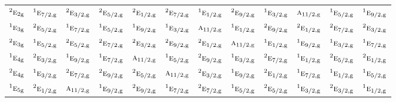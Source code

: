 \documentclass[10pt,a4paper]{article}
\numberwithin{equation}{section}
\newcommand{\irr}[1]{\text{\normalfont\scshape #1}}
\newcommand{\conjpair}[1]{{}^{#1}}
\newcommand{\ptag}[1]{\mathrm{#1}}
\begin{document}
{\begin{longtable}{@{}lccccccccccc@{}}
$\conjpair{2}\irr{e}_{2\ptag{g}}$ & $\conjpair{1}\irr{e}_{7/2,\ptag{g}}$ & $\conjpair{2}\irr{e}_{3/2,\ptag{g}}$ & $\conjpair{2}\irr{e}_{5/2,\ptag{g}}$ & $\conjpair{2}\irr{e}_{1/2,\ptag{g}}$ & $\conjpair{2}\irr{e}_{7/2,\ptag{g}}$ & $\conjpair{1}\irr{e}_{1/2,\ptag{g}}$ & $\conjpair{2}\irr{e}_{9/2,\ptag{g}}$ & $\conjpair{1}\irr{e}_{3/2,\ptag{g}}$ & $\irr{a}_{11/2,\ptag{g}}$ & $\conjpair{1}\irr{e}_{5/2,\ptag{g}}$ & $\conjpair{1}\irr{e}_{9/2,\ptag{g}}$\\
$\conjpair{1}\irr{e}_{3\ptag{g}}$ & $\conjpair{2}\irr{e}_{5/2,\ptag{g}}$ & $\conjpair{1}\irr{e}_{7/2,\ptag{g}}$ & $\conjpair{1}\irr{e}_{5/2,\ptag{g}}$ & $\conjpair{1}\irr{e}_{9/2,\ptag{g}}$ & $\conjpair{1}\irr{e}_{3/2,\ptag{g}}$ & $\irr{a}_{11/2,\ptag{g}}$ & $\conjpair{1}\irr{e}_{1/2,\ptag{g}}$ & $\conjpair{2}\irr{e}_{9/2,\ptag{g}}$ & $\conjpair{2}\irr{e}_{1/2,\ptag{g}}$ & $\conjpair{2}\irr{e}_{7/2,\ptag{g}}$ & $\conjpair{2}\irr{e}_{3/2,\ptag{g}}$\\
$\conjpair{2}\irr{e}_{3\ptag{g}}$ & $\conjpair{1}\irr{e}_{5/2,\ptag{g}}$ & $\conjpair{2}\irr{e}_{5/2,\ptag{g}}$ & $\conjpair{2}\irr{e}_{7/2,\ptag{g}}$ & $\conjpair{2}\irr{e}_{3/2,\ptag{g}}$ & $\conjpair{2}\irr{e}_{9/2,\ptag{g}}$ & $\conjpair{2}\irr{e}_{1/2,\ptag{g}}$ & $\irr{a}_{11/2,\ptag{g}}$ & $\conjpair{1}\irr{e}_{1/2,\ptag{g}}$ & $\conjpair{1}\irr{e}_{9/2,\ptag{g}}$ & $\conjpair{1}\irr{e}_{3/2,\ptag{g}}$ & $\conjpair{1}\irr{e}_{7/2,\ptag{g}}$\\
$\conjpair{1}\irr{e}_{4\ptag{g}}$ & $\conjpair{2}\irr{e}_{3/2,\ptag{g}}$ & $\conjpair{1}\irr{e}_{9/2,\ptag{g}}$ & $\conjpair{1}\irr{e}_{7/2,\ptag{g}}$ & $\irr{a}_{11/2,\ptag{g}}$ & $\conjpair{1}\irr{e}_{5/2,\ptag{g}}$ & $\conjpair{2}\irr{e}_{9/2,\ptag{g}}$ & $\conjpair{1}\irr{e}_{3/2,\ptag{g}}$ & $\conjpair{2}\irr{e}_{7/2,\ptag{g}}$ & $\conjpair{1}\irr{e}_{1/2,\ptag{g}}$ & $\conjpair{2}\irr{e}_{5/2,\ptag{g}}$ & $\conjpair{2}\irr{e}_{1/2,\ptag{g}}$\\
$\conjpair{2}\irr{e}_{4\ptag{g}}$ & $\conjpair{1}\irr{e}_{3/2,\ptag{g}}$ & $\conjpair{2}\irr{e}_{7/2,\ptag{g}}$ & $\conjpair{2}\irr{e}_{9/2,\ptag{g}}$ & $\conjpair{2}\irr{e}_{5/2,\ptag{g}}$ & $\irr{a}_{11/2,\ptag{g}}$ & $\conjpair{2}\irr{e}_{3/2,\ptag{g}}$ & $\conjpair{1}\irr{e}_{9/2,\ptag{g}}$ & $\conjpair{2}\irr{e}_{1/2,\ptag{g}}$ & $\conjpair{1}\irr{e}_{7/2,\ptag{g}}$ & $\conjpair{1}\irr{e}_{1/2,\ptag{g}}$ & $\conjpair{1}\irr{e}_{5/2,\ptag{g}}$\\
$\conjpair{1}\irr{e}_{5\ptag{g}}$ & $\conjpair{2}\irr{e}_{1/2,\ptag{g}}$ & $\irr{a}_{11/2,\ptag{g}}$ & $\conjpair{1}\irr{e}_{9/2,\ptag{g}}$ & $\conjpair{2}\irr{e}_{9/2,\ptag{g}}$ & $\conjpair{1}\irr{e}_{7/2,\ptag{g}}$ & $\conjpair{2}\irr{e}_{7/2,\ptag{g}}$ & $\conjpair{1}\irr{e}_{5/2,\ptag{g}}$ & $\conjpair{2}\irr{e}_{5/2,\ptag{g}}$ & $\conjpair{1}\irr{e}_{3/2,\ptag{g}}$ & $\conjpair{2}\irr{e}_{3/2,\ptag{g}}$ & $\conjpair{1}\irr{e}_{1/2,\ptag{g}}$\\

\end{longtable}}
\end{document}
